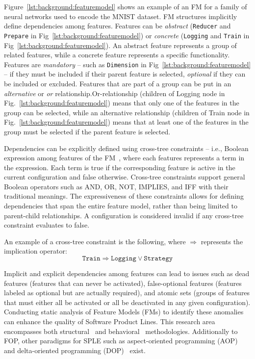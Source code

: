 Figure~\ref{lst:background:featuremodel} shows an example of an FM for a family of neural networks used to encode the MNIST dataset.
FM structures implicitly define dependencies among features. Features can be \textit{abstract} (\texttt{Reducer} and \texttt{Prepare} in Fig~\ref{lst:background:featuremodel}) or \textit{concrete} (\texttt{Logging} and \texttt{Train} in Fig~\ref{lst:background:featuremodel}).
An abstract feature represents a group of related features, while a concrete feature represents a specific functionality.
Features are \textit{mandatory} -- such as \texttt{Dimension} in Fig~\ref{lst:background:featuremodel} -- if they must be included if their parent feature is selected, \textit{optional} if they can be included or excluded.
Features that are part of a group can be put in an \textit{alternative} or \textit{or} relationship.Or-relationship (children of Logging node in Fig.~\ref{lst:background:featuremodel}) means that only one of the features in the group can be selected, while an alternative relationship (children of Train node in Fig.~\ref{lst:background:featuremodel}) means that at least one of the features in the group must be selected if the parent feature is selected.

Dependencies can be explicitly defined using cross-tree constraints -- i.e., Boolean expression among features of the FM~\cite{Cazzola22c}, where each features represents a term in the expression. Each term is true if the corresponding feature is active in the current configuration and false otherwise. Cross-tree constraints support general Boolean operators such as AND, OR, NOT, IMPLIES, and IFF with their traditional meanings.
The expressiveness of these constraints allows for defining dependencies that span the entire feature model, rather than being limited to parent-child relationships. A configuration is considered invalid if any cross-tree constraint evaluates to false.

An example of a cross-tree constraint is the following, where $\Rightarrow$ represents the implication operator:
\begin{equation*}
    \texttt{Train} \Rightarrow \texttt{Logging} \vee \texttt{Strategy}
\end{equation*}

Implicit and explicit dependencies among features can lead to issues such as dead features (features that can never be activated), false-optional features (features labeled as optional but are actually required), and atomic sets (groups of features that must either all be activated or all be deactivated in any given configuration). Conducting static analysis of Feature Models (FMs) to identify these anomalies can enhance the quality of Software Product Lines. This research area encompasses both structural~\cite{TerBeek21} and behavioral~\cite{Benavides10} methodologies.
 Additionally to FOP, other paradigms for SPLE such as aspect-oriented programming (AOP)~\cite{Groher09} and delta-oriented programming (DOP)~\cite{Koscielny14} exist.


